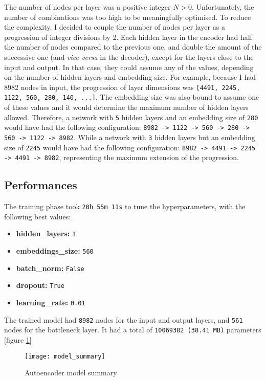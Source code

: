The number of nodes per layer was a positive integer $N > 0$. Unfortunately, the number of combinations was too high to be
meaningfully optimised. To reduce the complexity, I decided to couple the number of nodes per layer as a progression
of integer divisions by 2.
Each hidden layer in the encoder had half the number of nodes compared to the previous one, and double the amount of the successive one
(and \textit{vice versa} in the decoder), except for the layers close to the input and output.
In that case, they could assume any of the values, depending on the number of hidden layers and embedding size.
For example, because I had 8982 nodes in input, the progression of layer dimensions
was \verb|[4491, 2245, 1122, 560, 280, 140, ...]|.
The embedding size was also bound to assume one of these values and it would determine
the maximum number of hidden layers allowed.
Therefore, a network with \verb|5| hidden layers and an embedding size of \verb|280|
would have had the following configuration: \verb|8982 -> 1122 -> 560 -> 280 -> 560 -> 1122 -> 8982|.
While a network with \verb|3| hidden layers but an embedding size of \verb|2245| would have had the following configuration:
\verb|8982 -> 4491 -> 2245 -> 4491 -> 8982|, representing the maximum extension of the progression.

\subsection{Performances}

The training phase took \verb|20h 55m 11s| to tune the hyperparameters, with the following best values:

\begin{itemize}
  \item \textbf{hidden\_layers:} \verb|1|
  \item \textbf{embeddings\_size:} \verb|560|
  \item \textbf{batch\_norm:} \verb|False|
  \item \textbf{dropout:} \verb|True|
  \item \textbf{learning\_rate:} \verb|0.01|
\end{itemize}

The trained model had \verb|8982| nodes for the input and output layers, and \verb|561| nodes for the bottleneck layer.
It had a total of \verb|10069382 (38.41 MB)| parameters [figure \ref{fig:model_summary}]

\begin{figure}[H]
  \centering
  \texttt{[image: model\_summary]}
  \caption{Autoencoder model summary}
  \label{fig:model_summary}
\end{figure}

